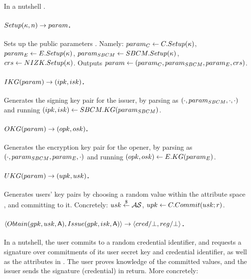In a nutshell .

\paragraph{$Setup(\kappa,n) \rightarrow param$.} %
Sets up the public parameters . Namely: $param_C \gets C.Setup(\kappa)$, $param_{E} \gets
E.Setup(\kappa)$, $param_{SBCM} \gets SBCM.Setup(\kappa)$, $crs \gets
NIZK.Setup(\kappa)$. Outputs $param \gets (param_C,param_{SBCM},param_{E},crs)$.

\paragraph{$IKG(param) \rightarrow (ipk,isk)$.} %
Generates the signing key pair for the issuer, by parsing \parm as
$(\cdot,param_{SBCM},\cdot,\cdot)$ and running $(ipk,isk) \gets
SBCM.KG(param_{SBCM})$.

\paragraph{$OKG(param) \rightarrow (opk,osk)$.} %
Generates the encryption key pair for the opener, by parsing \parm as
$(\cdot,param_{SBCM},param_{E},\cdot)$ and running $(opk,osk) \gets
E.KG(param_{E})$.

\paragraph{$UKG(param) \rightarrow (upk,usk)$.} %
Generates users' key pairs by choosing a random value within the attribute space
\AttrSpace, and committing to it. Concretely: $usk \stackrel{\$}{\gets} \mathcal{AS}$, $upk
\gets C.Commit(usk; r)$.

\paragraph{$\langle Obtain(gpk,usk,\mathsf{A}),Issue(gpk,isk,\mathsf{A}) \rangle
  \rightarrow \langle cred/\bot,reg/\bot \rangle$.} %
In a nutshell, the user commits to a random credential identifier, and requests
a signature over commitments of its user secret key and credential identifier,
as well as the attributes in \Attrs. The user proves knowledge of the committed
values, and the issuer sends the signature (credential) in return. More
concretely:

